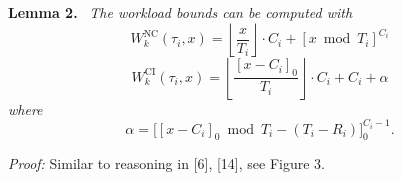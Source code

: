 \textbf{Lemma 2.} \ \textit{The workload bounds can be computed with}
\[
W_k^{\mathrm{NC}}(\tau_i,x)
=
\left\lfloor \frac{x}{T_i} \right\rfloor \cdot C_i
+
[x \bmod T_i]^{C_i}
\tag{5}
\]
\[
W_k^{\mathrm{CI}}(\tau_i,x)
=
\left\lfloor \frac{[x-C_i]_0}{T_i} \right\rfloor \cdot C_i
+
C_i + \alpha
\tag{6}
\]
\textit{where}
\[
\alpha = \bigl[[x-C_i]_0 \bmod T_i - (T_i - R_i)\bigr]_0^{C_i-1}.
\]

\textit{Proof:} Similar to reasoning in [6], [14], see Figure 3.